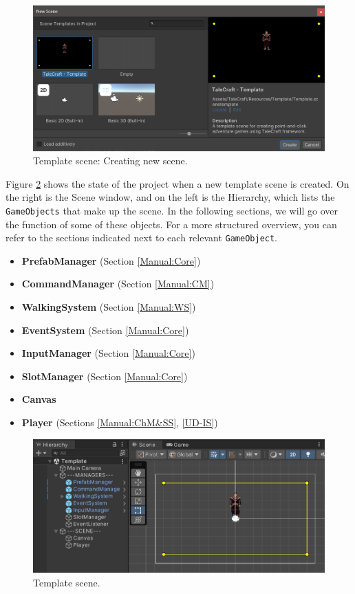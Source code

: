 \begin{figure}[H]
\centering
\includegraphics[width=.9\linewidth]{img/User doc/image_2025-07-09_161736255.png}
\caption{Template scene: Creating new scene.}
\label{fig:Tutorial-template:new}
\end{figure}

Figure \ref{fig:Tutorial-template} shows the state of the project when a new template scene is created. On the right is the Scene window, and on the left is the Hierarchy, which lists the \verb|GameObjects| that make up the scene. In the following sections, we will go over the function of some of these objects. For a more structured overview, you can refer to the sections indicated next to each relevant \texttt{GameObject}.

\begin{itemize}
    \item \textbf{PrefabManager} (Section \ref{Manual:Core})
    \item \textbf{CommandManager} (Section \ref{Manual:CM})
    \item \textbf{WalkingSystem} (Section \ref{Manual:WS})
    \item \textbf{EventSystem} (Section \ref{Manual:Core})
    \item \textbf{InputManager} (Section \ref{Manual:Core})
    \item \textbf{SlotManager} (Section \ref{Manual:Core})
    \item \textbf{Canvas}
    \item \textbf{Player} (Sections \ref{Manual:ChM&SS}, \ref{UD-IS})
\end{itemize}

\begin{figure}[H]
\centering
\includegraphics[width=.9\linewidth]{img/User doc/image_2025-07-08_100816915.png}
\caption{Template scene.}
\label{fig:Tutorial-template}
\end{figure}


